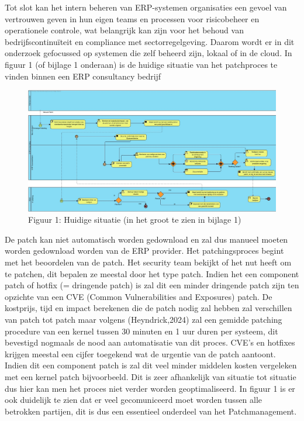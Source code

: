 \documentclass[dutch,dit,thesis]{hogentreport}
\begin{document}
Tot slot kan het intern beheren van ERP-systemen organisaties een gevoel van vertrouwen geven in hun eigen teams en processen voor risicobeheer en operationele controle, wat belangrijk 
kan zijn voor het behoud van bedrijfscontinuïteit en compliance met sectorregelgeving. Daarom wordt er in dit onderzoek gefocussed op systemen die zelf beheerd zijn, lokaal of in de cloud. In figuur 1 (of bijlage 1 onderaan) is de huidige situatie van het patchproces te vinden binnen een ERP consultancy bedrijf \\

\begin{figure}[htbp]
    \centering
    \includegraphics[width=\textwidth]{huidigesituatie.jpg}
    \caption{Figuur 1: Huidige situatie (in het groot te zien in bijlage 1)}
    \label{fig:huidigesituatie}
\end{figure}

De patch kan niet automatisch worden gedownload en zal dus manueel moeten worden gedownload worden van de ERP provider. Het patchingsproces begint met het beoordelen van de patch. Het security team bekijkt of het nut heeft
om te patchen, dit bepalen ze meestal door het type patch. Indien het een component patch of hotfix (= dringende patch) is zal dit een minder dringende patch zijn ten opzichte van een CVE (Common Vulnerabilities and Exposures) patch. De kostprijs, tijd en impact berekenen
die de patch nodig zal hebben zal verschillen van patch tot patch maar volgens (Heyndrick,2024) zal een gemidde patching procedure van een kernel tussen 30 minuten en 1 uur duren per systeem, dit bevestigd nogmaals de nood aan automatisatie van dit proces. CVE's en hotfixes krijgen meestal een cijfer toegekend wat de urgentie van de patch aantoont. Indien dit een component patch is zal dit veel minder middelen kosten vergeleken
met een kernel patch bijvoorbeeld. Dit is zeer afhankelijk van situatie tot situatie dus hier kan men het proces niet verder worden geoptimaliseerd. In figuur 1 is er ook duidelijk te zien dat er veel gecomuniceerd moet worden tussen alle betrokken partijen, dit is dus een essentieel onderdeel van het Patchmanagement. \\
\end{document}
